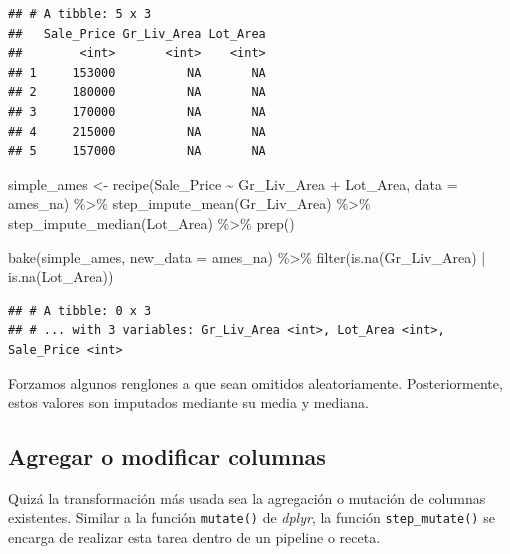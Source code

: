 \documentclass[
]{book}
\newenvironment{Shaded}{\begin{snugshade}}{\end{snugshade}}
\newcommand{\AttributeTok}[1]{\textcolor[rgb]{0.77,0.63,0.00}{#1}}
\newcommand{\FunctionTok}[1]{\textcolor[rgb]{0.00,0.00,0.00}{#1}}
\newcommand{\NormalTok}[1]{#1}
\newcommand{\OtherTok}[1]{\textcolor[rgb]{0.56,0.35,0.01}{#1}}
\newcommand{\SpecialCharTok}[1]{\textcolor[rgb]{0.00,0.00,0.00}{#1}}
\begin{document}
\begin{verbatim}
## # A tibble: 5 x 3
##   Sale_Price Gr_Liv_Area Lot_Area
##        <int>       <int>    <int>
## 1     153000          NA       NA
## 2     180000          NA       NA
## 3     170000          NA       NA
## 4     215000          NA       NA
## 5     157000          NA       NA
\end{verbatim}

\begin{Shaded}
\begin{Highlighting}[]
\NormalTok{simple\_ames }\OtherTok{\textless{}{-}} \FunctionTok{recipe}\NormalTok{(Sale\_Price }\SpecialCharTok{\textasciitilde{}}\NormalTok{ Gr\_Liv\_Area }\SpecialCharTok{+}\NormalTok{ Lot\_Area, }\AttributeTok{data =}\NormalTok{ ames\_na) }\SpecialCharTok{\%\textgreater{}\%}
  \FunctionTok{step\_impute\_mean}\NormalTok{(Gr\_Liv\_Area) }\SpecialCharTok{\%\textgreater{}\%} 
  \FunctionTok{step\_impute\_median}\NormalTok{(Lot\_Area) }\SpecialCharTok{\%\textgreater{}\%} 
  \FunctionTok{prep}\NormalTok{()}

\FunctionTok{bake}\NormalTok{(simple\_ames, }\AttributeTok{new\_data =}\NormalTok{ ames\_na) }\SpecialCharTok{\%\textgreater{}\%} 
  \FunctionTok{filter}\NormalTok{(}\FunctionTok{is.na}\NormalTok{(Gr\_Liv\_Area) }\SpecialCharTok{|} \FunctionTok{is.na}\NormalTok{(Lot\_Area))}
\end{Highlighting}
\end{Shaded}

\begin{verbatim}
## # A tibble: 0 x 3
## # ... with 3 variables: Gr_Liv_Area <int>, Lot_Area <int>, Sale_Price <int>
\end{verbatim}

Forzamos algunos renglones a que sean omitidos aleatoriamente. Posteriormente, estos valores son imputados mediante su media y mediana.

\hypertarget{agregar-o-modificar-columnas}{%
\subsection{Agregar o modificar columnas}\label{agregar-o-modificar-columnas}}

Quizá la transformación más usada sea la agregación o mutación de columnas existentes. Similar a la función \texttt{mutate()} de \emph{dplyr}, la función \texttt{step\_mutate()} se encarga de realizar esta tarea dentro de un pipeline o receta.
\end{document}
